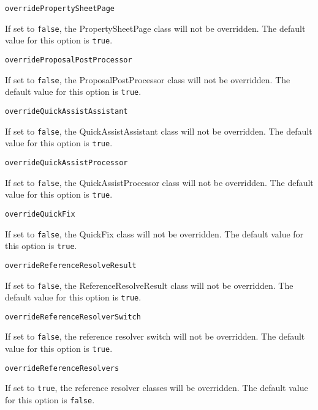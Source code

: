 \noindent\texttt{overridePropertySheetPage}
\begin{myindentpar}{1cm}
If set to \texttt{false}, the PropertySheetPage class will not be overridden. The default value for this option is \texttt{true}.
\end{myindentpar}

\noindent\texttt{overrideProposalPostProcessor}
\begin{myindentpar}{1cm}
If set to \texttt{false}, the ProposalPostProcessor class will not be overridden. The default value for this option is \texttt{true}.
\end{myindentpar}

\noindent\texttt{overrideQuickAssistAssistant}
\begin{myindentpar}{1cm}
If set to \texttt{false}, the QuickAssistAssistant class will not be overridden. The default value for this option is \texttt{true}.
\end{myindentpar}

\noindent\texttt{overrideQuickAssistProcessor}
\begin{myindentpar}{1cm}
If set to \texttt{false}, the QuickAssistProcessor class will not be overridden. The default value for this option is \texttt{true}.
\end{myindentpar}

\noindent\texttt{overrideQuickFix}
\begin{myindentpar}{1cm}
If set to \texttt{false}, the QuickFix class will not be overridden. The default value for this option is \texttt{true}.
\end{myindentpar}

\noindent\texttt{overrideReferenceResolveResult}
\begin{myindentpar}{1cm}
If set to \texttt{false}, the ReferenceResolveResult class will not be overridden. The default value for this option is \texttt{true}.
\end{myindentpar}

\noindent\texttt{overrideReferenceResolverSwitch}
\begin{myindentpar}{1cm}
If set to \texttt{false}, the reference resolver switch will not be overridden. The default value for this option is \texttt{true}.
\end{myindentpar}

\noindent\texttt{overrideReferenceResolvers}
\begin{myindentpar}{1cm}
If set to \texttt{true}, the reference resolver classes will be overridden. The default value for this option is \texttt{false}.
\end{myindentpar}


